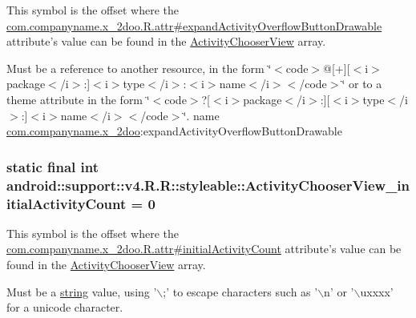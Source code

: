 This symbol is the offset where the \hyperlink{classcom_1_1companyname_1_1x__2doo_1_1_r_1_1attr_7b3a130b57219e16909ff5f27586013c}{com.companyname.x\_\-2doo.R.attr\#expandActivityOverflowButtonDrawable} attribute's value can be found in the \hyperlink{classandroid_1_1support_1_1v4_1_1_r_1_1styleable_8ebac440352ca658a6c7d0b99e1eb8da}{ActivityChooserView} array.

Must be a reference to another resource, in the form \char`\"{}$<$code$>$@\mbox{[}+\mbox{]}\mbox{[}$<$i$>$package$<$/i$>$:\mbox{]}$<$i$>$type$<$/i$>$:$<$i$>$name$<$/i$>$$<$/code$>$\char`\"{} or to a theme attribute in the form \char`\"{}$<$code$>$?\mbox{[}$<$i$>$package$<$/i$>$:\mbox{]}\mbox{[}$<$i$>$type$<$/i$>$:\mbox{]}$<$i$>$name$<$/i$>$$<$/code$>$\char`\"{}.  name \hyperlink{namespacecom_1_1companyname_1_1x__2doo}{com.companyname.x\_\-2doo}:expandActivityOverflowButtonDrawable \hypertarget{classandroid_1_1support_1_1v4_1_1_r_1_1styleable_1bbab56b57a1d4dbf1b6419979ba355b}{
\subsubsection[{ActivityChooserView\_\-initialActivityCount}]{\setlength{\rightskip}{0pt plus 5cm}static final int android::support::v4.R.R::styleable::ActivityChooserView\_\-initialActivityCount = 0}}
\label{classandroid_1_1support_1_1v4_1_1_r_1_1styleable_1bbab56b57a1d4dbf1b6419979ba355b}


This symbol is the offset where the \hyperlink{classcom_1_1companyname_1_1x__2doo_1_1_r_1_1attr_b456a9292f255170ddf6c1a681d696f1}{com.companyname.x\_\-2doo.R.attr\#initialActivityCount} attribute's value can be found in the \hyperlink{classandroid_1_1support_1_1v4_1_1_r_1_1styleable_8ebac440352ca658a6c7d0b99e1eb8da}{ActivityChooserView} array.

Must be a \hyperlink{classandroid_1_1support_1_1v4_1_1_r_1_1string}{string} value, using '$\backslash$;' to escape characters such as '$\backslash$n' or '$\backslash$uxxxx' for a unicode character. 

